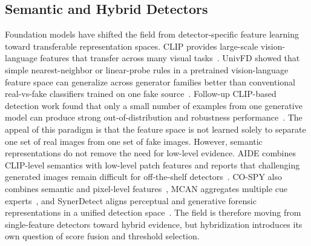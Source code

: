 \documentclass[lettersize,journal]{IEEEtran}
\begin{document}
\subsection{Semantic and Hybrid Detectors}
Foundation models have shifted the field from detector-specific feature learning toward transferable representation spaces. CLIP provides large-scale vision-language features that transfer across many visual tasks~\cite{radford2021clip}. UnivFD showed that simple nearest-neighbor or linear-probe rules in a pretrained vision-language feature space can generalize across generator families better than conventional real-vs-fake classifiers trained on one fake source~\cite{ojha2023univfd}. Follow-up CLIP-based detection work found that only a small number of examples from one generative model can produce strong out-of-distribution and robustness performance~\cite{cozzolino2024clip}. The appeal of this paradigm is that the feature space is not learned solely to separate one set of real images from one set of fake images. However, semantic representations do not remove the need for low-level evidence. AIDE combines CLIP-level semantics with low-level patch features and reports that challenging generated images remain difficult for off-the-shelf detectors~\cite{yan2025aide}. CO-SPY also combines semantic and pixel-level features~\cite{cheng2025cospy}, MCAN aggregates multiple cue experts~\cite{tan2026mcan}, and SynerDetect aligns perceptual and generative forensic representations in a unified detection space~\cite{li2026synerdetect}. The field is therefore moving from single-feature detectors toward hybrid evidence, but hybridization introduces its own question of score fusion and threshold selection.
\end{document}
